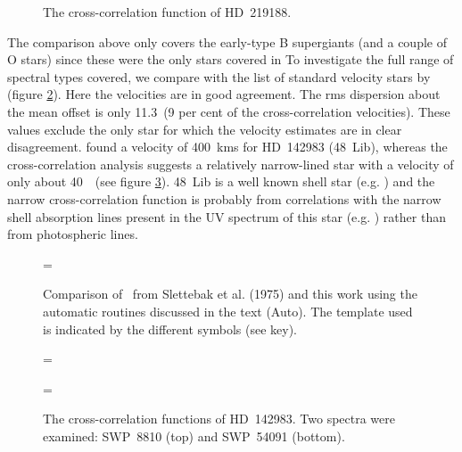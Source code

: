 \begin{figure} %
\epsfxsize=9cm
\setlength{\cen}{(\textwidth / 2) - (\epsfxsize / 2)}
\hspace{\cen}
\caption[The CCF of HD~219188]
{\fcfont The cross-correlation function of HD~219188.}
\label{fig:ccf:hd219188}
\end{figure}   %

The comparison above only covers the early-type B supergiants (and a
couple of O stars) since these were the only stars covered in
 To investigate the full range of spectral types
covered, we compare with the list of standard velocity stars by
 (figure
\ref{fig:sletcomp}). Here the velocities are in good agreement. The
rms dispersion about the mean offset is only 11.3~\kms (9 per cent of
the cross-correlation velocities).%
%
%
These values exclude the only star for which the velocity estimates
are in clear disagreement.  found a velocity of 400~kms
for HD~142983 (48~Lib), whereas the cross-correlation analysis
suggests a relatively narrow-lined star with a velocity of only about
40~\kms\ (see figure \ref{fig:ccf:hd142983}). 48~Lib is a well known
shell star (e.g. \cite{un:48lib}) and the narrow cross-correlation
function is probably from correlations with the narrow shell
absorption lines present in the UV spectrum of this star
(e.g. \cite{1981A&A...100...79R}) rather than from photospheric lines.


\begin{figure} %
\epsfxsize=\figwidth
\setlength{\cen}{(\textwidth / 2) - (\epsfxsize / 2)}
\hspace{\cen}
\caption[Comparison of \vsini\ from Slettebak et al. (1975) and this work]
{\fcfont Comparison of \vsini\ from Slettebak et al. (1975) and this
work using the automatic routines discussed in the text (Auto). The
template used is indicated by the different symbols (see key).}
\label{fig:sletcomp}
\end{figure}   %

\begin{figure} %
\epsfxsize=\figwidth
\setlength{\cen}{(\textwidth / 2) - (\epsfxsize / 2)}
\hspace{\cen}

\epsfxsize=\figwidth
\setlength{\cen}{(\textwidth / 2) - (\epsfxsize / 2)}
\hspace{\cen}
\caption[The CCFs of HD~142983]
{\fcfont The cross-correlation functions of HD~142983. Two spectra
were examined: SWP~8810 (top) and SWP~54091 (bottom).}
\label{fig:ccf:hd142983}
\end{figure}   %

